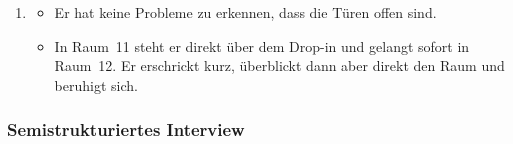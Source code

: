 \documentclass[../Main.tex]{subfiles}
\begin{document}
\begin{enumerate}[label=\textbf{B\arabic*}, leftmargin=1.5cm, itemsep=0.8em, resume]
\begin{itemize}[nosep]
\item Er sucht nach interaktiven Objekten; es gibt aber keine.
\item Er wechselt zwischen Heavy und Light Attack ab.
\item Er versucht, die Gegner von seinem High Ground aus auszutricksen, was aber nicht funktioniert.
\item Er bemerkt, dass die Angriffe unterschiedlich viel Schaden machen und dass zwei Heavy Attacks einen Archer direkt besiegen.
\item Er ist die ganze Zeit eher damit beschäftigt, das Spiel zu beobachten und Muster sowie Bugs zu finden.
\end{itemize}
\item
\begin{itemize}[nosep]
\item Er hat keine Probleme zu erkennen, dass die Türen offen sind.
\item In Raum~11 steht er direkt über dem Drop-in und gelangt sofort in Raum~12. Er erschrickt kurz, überblickt dann aber direkt den Raum und beruhigt sich.
\end{itemize}
\end{enumerate}

\subsubsection{Semistrukturiertes Interview}
\end{document}
